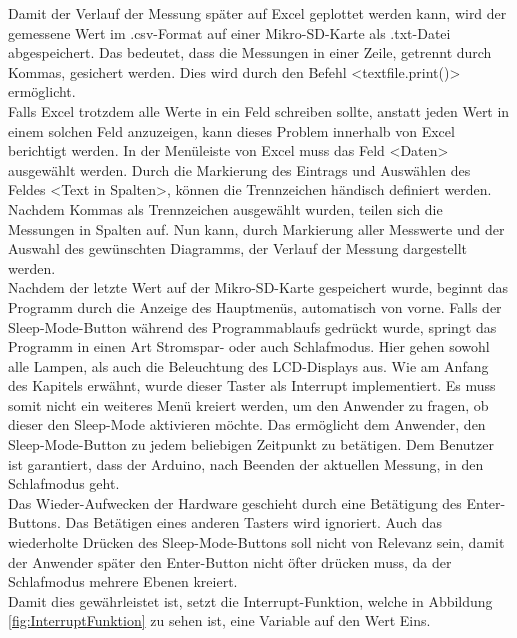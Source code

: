 Damit der Verlauf der Messung später auf Excel geplottet werden kann, wird der gemessene Wert im .csv-Format auf einer Mikro-SD-Karte als .txt-Datei abgespeichert. Das bedeutet, dass die Messungen in einer Zeile, getrennt durch Kommas, gesichert werden. Dies wird durch den Befehl <textfile.print()> ermöglicht. \\
Falls Excel trotzdem alle Werte in ein Feld schreiben sollte, anstatt jeden Wert in einem solchen Feld anzuzeigen, kann dieses Problem innerhalb von Excel berichtigt werden. In der Menüleiste von Excel muss das Feld <Daten> ausgewählt werden. Durch die Markierung des Eintrags und Auswählen des Feldes <Text in Spalten>, können die Trennzeichen händisch definiert werden. Nachdem Kommas als Trennzeichen ausgewählt wurden, teilen sich die Messungen in Spalten auf. Nun kann, durch Markierung aller Messwerte und der Auswahl des gewünschten Diagramms, der Verlauf der Messung dargestellt werden. \\
Nachdem der letzte Wert auf der Mikro-SD-Karte gespeichert wurde, beginnt das Programm durch die Anzeige des Hauptmenüs, automatisch von vorne. Falls der Sleep-Mode-Button während des Programmablaufs gedrückt wurde, springt das Programm in einen Art Stromspar- oder auch Schlafmodus. Hier gehen sowohl alle Lampen, als auch die Beleuchtung des \ac{LCD}-Displays aus. Wie am Anfang des Kapitels erwähnt, wurde dieser Taster als Interrupt implementiert. Es muss somit nicht ein weiteres Menü kreiert werden, um den Anwender zu fragen, ob dieser den Sleep-Mode aktivieren möchte. Das ermöglicht dem Anwender, den Sleep-Mode-Button zu jedem beliebigen Zeitpunkt zu betätigen. Dem Benutzer ist garantiert, dass der Arduino, nach Beenden der aktuellen Messung, in den Schlafmodus geht. \\
Das Wieder-Aufwecken der Hardware geschieht durch eine Betätigung des Enter-Buttons. Das Betätigen eines anderen Tasters wird ignoriert. Auch das wiederholte Drücken des Sleep-Mode-Buttons soll nicht von Relevanz sein, damit der Anwender später den Enter-Button nicht öfter drücken muss, da der Schlafmodus mehrere Ebenen kreiert. \\
Damit dies gewährleistet ist, setzt die Interrupt-Funktion, welche in Abbildung \ref{fig:InterruptFunktion} zu sehen ist, eine Variable auf den Wert Eins. \\
